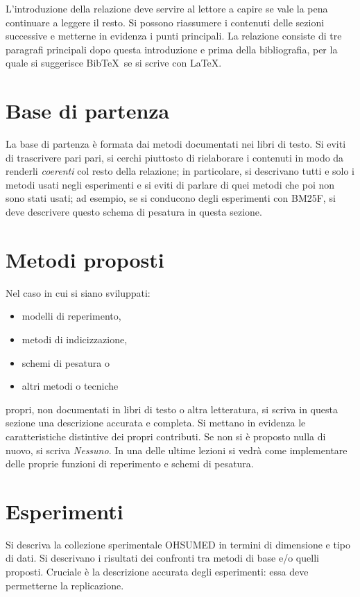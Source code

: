 \documentclass[runningheads]{llncs}
\begin{document}
L'introduzione della relazione deve servire al lettore a capire se
vale la pena continuare a leggere il resto.  Si possono riassumere i
contenuti delle sezioni successive e metterne in evidenza i punti
principali.  La relazione consiste di tre paragrafi principali dopo
questa introduzione e prima della bibliografia, per la quale si
suggerisce Bib\TeX\ se si scrive con \LaTeX.

\section{Base di partenza}
\label{sec:base-di-partenza}

La base di partenza \`e formata dai metodi documentati nei libri di
testo.  Si eviti di trascrivere pari pari, si cerchi piuttosto di
rielaborare i contenuti in modo da renderli \emph{coerenti} col resto
della relazione; in particolare, si descrivano tutti e solo i metodi
usati negli esperimenti e si eviti di parlare di quei metodi che poi
non sono stati usati; ad esempio, se si conducono degli esperimenti
con BM25F, si deve descrivere questo schema di pesatura in questa
sezione.

\section{Metodi proposti}
\label{sec:metodi-utilizzati}

Nel caso in cui si siano sviluppati:
\begin{itemize}
\item modelli di reperimento,
\item metodi di indicizzazione,
\item schemi di pesatura o
\item altri metodi o tecniche
\end{itemize}
propri, non documentati in libri di testo o altra letteratura, si
scriva in questa sezione una descrizione accurata e completa.  Si
mettano in evidenza le caratteristiche distintive dei propri
contributi.  Se non si \`e proposto nulla di nuovo, si scriva
\emph{Nessuno}.  In una delle ultime lezioni si vedr\`a come
implementare delle proprie funzioni di reperimento e schemi di
pesatura.

\section{Esperimenti}
\label{sec:esperimenti}

Si descriva la collezione sperimentale OHSUMED in termini di
dimensione e tipo di dati.  Si descrivano i risultati dei confronti
tra metodi di base e/o quelli proposti.  Cruciale \`e la descrizione
accurata degli esperimenti: essa deve permetterne la replicazione.
\end{document}
